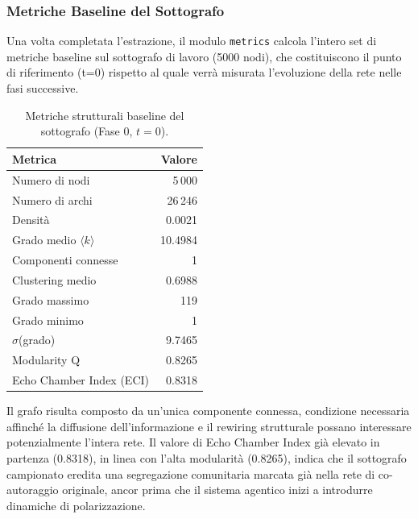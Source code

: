 \documentclass[11pt, a4paper]{article}
\begin{document}
\subsubsection{Metriche Baseline del Sottografo}
Una volta completata l'estrazione, il modulo \texttt{metrics} calcola l'intero set di metriche baseline sul sottografo di lavoro (5000 nodi), che costituiscono il punto di riferimento (t=0) rispetto al quale verrà misurata l'evoluzione della rete nelle fasi successive.

\begin{table}[h]
    \centering
    \small
    \begin{tabular}{lr}
        \toprule
        \textbf{Metrica} & \textbf{Valore} \\
        \midrule
        Numero di nodi                     & 5\,000 \\
        Numero di archi                    & 26\,246 \\
        Densità                            & 0.0021 \\
        Grado medio $\langle k \rangle$    & 10.4984 \\
        Componenti connesse                & 1 \\
        Clustering medio                   & 0.6988 \\
        Grado massimo                      & 119 \\
        Grado minimo                       & 1 \\
        $\sigma$(grado)                    & 9.7465 \\
        Modularity Q                       & 0.8265 \\
        Echo Chamber Index (ECI)           & 0.8318 \\
        \bottomrule
    \end{tabular}
    \caption{Metriche strutturali baseline del sottografo (Fase 0, $t=0$).}
    \label{tab:metriche-baseline}
\end{table}

Il grafo risulta composto da un'unica componente connessa, condizione necessaria affinché la diffusione dell'informazione e il rewiring strutturale possano interessare potenzialmente l'intera rete. Il valore di Echo Chamber Index già elevato in partenza (0.8318), in linea con l'alta modularità (0.8265), indica che il sottografo campionato eredita una segregazione comunitaria marcata già nella rete di co-autoraggio originale, ancor prima che il sistema agentico inizi a introdurre dinamiche di polarizzazione.
\end{document}
